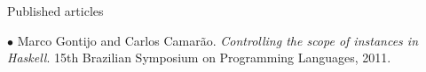 \begin{rubric}{Published articles}

\entry*
$\bullet$ Marco Gontijo and Carlos Camarão.  \emph{Controlling the scope of instances in Haskell}.  15th Brazilian Symposium on Programming Languages, 2011.

\end{rubric}
